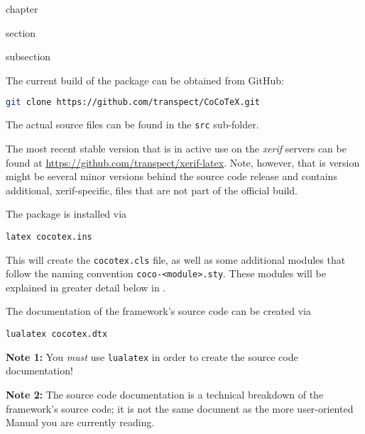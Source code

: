 \begin{Heading}{chapter}
\end{Heading}

\begin{Heading}{section}
\end{Heading}

\begin{Heading}{subsection}
\end{Heading}

The current build of the package can be obtained from GitHub:
\begin{lstlisting}[style=tex,language=bash]
git clone https://github.com/transpect/CoCoTeX.git
\end{lstlisting}
The actual source files can be found in the \lstinline{src} sub-folder.


The most recent stable version that is in active use on the
\textit{xerif} servers can be found at
\url{https://github.com/transpect/xerif-latex}. Note, however, that is
version might be several minor versions behind the source code release
and contains additional, xerif-specific, files that are not part of
the official {\CoCoTeX} build.

The package is installed via
\begin{lstlisting}[style=bash]
latex cocotex.ins
\end{lstlisting}
This will create the \lstinline{cocotex.cls} file, as well as some
additional modules that follow the naming convention
\lstinline{coco-<module>.sty}. These modules will be explained in
greater detail below in .

The documentation of the framework's source code can be created via
\begin{lstlisting}[style=bash]
lualatex cocotex.dtx
\end{lstlisting}
\textbf{Note 1:} You \textit{must} use \lstinline{lualatex} in order to
create the source code documentation!

\textbf{Note 2:} The source code documentation is a technical breakdown
of the framework's source code; it is not the same document as the
more user-oriented Manual you are currently reading.


